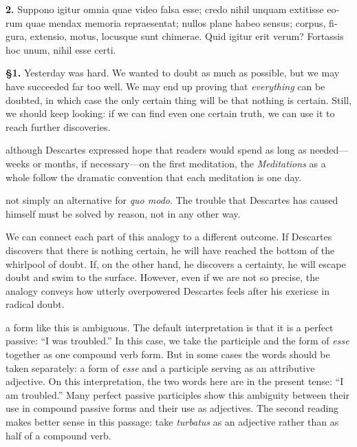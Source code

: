 \beginnumbering
\pstart
\begin{latin}
    \textenglish{\textbf{2.}} Suppono igitur omnia quae video falsa esse; credo nihil unquam extitisse eorum quae mendax memoria repraesentat; nullos plane habeo sensus; corpus, figura, extensio, motus, locusque sunt chimerae. Quid igitur erit verum? Fortassis hoc unum, nihil esse certi.
\end{latin}
\pend
\endnumbering

\prenotes

\textbf{§1.} Yesterday was hard. We wanted to doubt as much as possible, but we may have succeeded far too well. We may end up proving that \textit{everything} can be doubted, in which case the only certain thing will be that nothing is certain. Still, we should keep looking: if we can find even one certain truth, we can use it to reach further discoveries.

 although Descartes expressed hope that readers would spend as long as needed---weeks or months, if necessary---on the first meditation, the \textit{Meditations} as a whole follow the dramatic convention that each meditation is one day.

 not simply an alternative for \textit{quo modo}. The trouble that Descartes has caused himself must be solved by reason, not in any other way.

 We can connect each part of this analogy to a different outcome. If Descartes discovers that there is nothing certain, he will have reached the bottom of the whirlpool of doubt. If, on the other hand, he discovers a certainty, he will escape doubt and swim to the surface. However, even if we are not so precise, the analogy conveys how utterly overpowered Descartes feels after his exericse in radical doubt.

 a form like this is ambiguous. The default interpretation is that it is a perfect passive: ``I was troubled.'' In this case, we take the participle and the form of \textit{esse} together as one compound verb form. But in some cases the words should be taken separately: a form of \textit{esse} and a participle serving as an attributive adjective. On this interpretation, the two words here are in the present tense: ``I am troubled.'' Many perfect passive participles show this ambiguity between their use in compound passive forms and their use as adjectives. The second reading makes better sense in this passage: take \textit{turbatus} as an adjective rather than as half of a compound verb.

